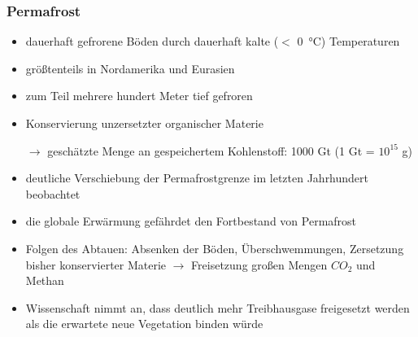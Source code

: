 \begin{frame}
	\frametitle{Permafrost} %
	\begin{itemize}
		\item dauerhaft gefrorene Böden durch dauerhaft kalte ($<$ \SI{0}{\degreeCelsius}) Temperaturen
		\item größtenteils in Nordamerika und Eurasien
		\item zum Teil mehrere hundert Meter tief gefroren
		\item Konservierung unzersetzter organischer Materie
		\item [$\rightarrow$] geschätzte Menge an gespeichertem Kohlenstoff: 1000 Gt (1 Gt = $10^{15}$ g)
		\item deutliche Verschiebung der Permafrostgrenze im letzten Jahrhundert beobachtet
		\item die globale Erwärmung gefährdet den Fortbestand von Permafrost
		\item Folgen des Abtauen: Absenken der Böden, Überschwemmungen, Zersetzung bisher konservierter Materie $\rightarrow$ Freisetzung großen Mengen $CO_2$ und Methan
		\item Wissenschaft nimmt an, dass deutlich mehr Treibhausgase freigesetzt werden als die erwartete neue Vegetation binden würde
	\end{itemize}

\end{frame}

